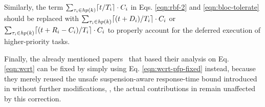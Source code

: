 Similarly, the term $\sum_{\tau_i \in \mathit{hp}(k)} \lceil t / T_i \rceil \cdot C_i$ in Eqs. \eqref{eqn:rbf-2} and \eqref{eqn:bloc-tolerate} should be replaced with $\sum_{\tau_i \in \mathit{hp}(k)} \lceil (t+D_i) / T_i \rceil \cdot C_i$ or $\sum_{\tau_i \in \mathit{hp}(k)} \lceil (t+R_i-C_i) / T_i \rceil \cdot C_i$ to properly account for the deferred execution of higher-priority tasks.

Finally, the already mentioned papers~\cite{zeng-2011,bbb-2013,yang-2013,kim-2014,han-2014,carminati-2014,yang-2014} that based their analysis on Eq. \eqref{eqn:wcrt} can be fixed by simply using Eq. \eqref{eqn:wcrt-pfp-fixed} instead, because they merely reused the unsafe suspension-aware response-time bound introduced in \cite{lakshmanan-2009} without further modifications, \ie, the actual contributions in \cite{zeng-2011,bbb-2013,yang-2013,kim-2014,han-2014,carminati-2014,yang-2014} remain unaffected by this correction.
  
  




  